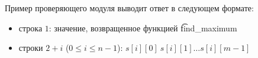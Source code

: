 Пример проверяющего модуля выводит ответ в следующем формате:
\begin{itemize}
\item строка $1$: значение, возвращенное функцией \t{find\_maximum}
\item строки $2+i$ ($0\leq i\leq n-1$): $s[i][0]\ s[i][1]\ldots s[i][m-1]$
\end{itemize}
